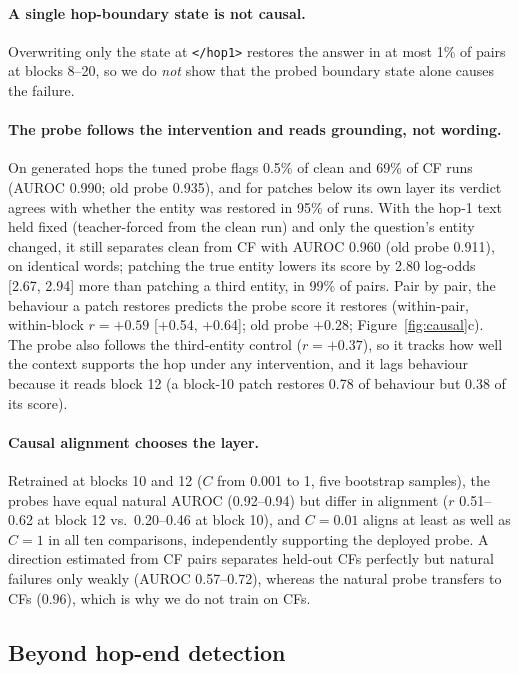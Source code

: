 \documentclass[11pt]{article}
\begin{document}
\paragraph{A single hop-boundary state is not causal.} Overwriting only the state at \texttt{</hop1>} restores the answer in at most 1\% of pairs at blocks 8--20, so we do \emph{not} show that the probed boundary state alone causes the failure.

\paragraph{The probe follows the intervention and reads grounding, not wording.} On generated hops the tuned probe flags 0.5\% of clean and 69\% of CF runs (AUROC 0.990; old probe 0.935), and for patches below its own layer its verdict agrees with whether the entity was restored in 95\% of runs. With the hop-1 text held fixed (teacher-forced from the clean run) and only the question's entity changed, it still separates clean from CF with AUROC 0.960 (old probe 0.911), on identical words; patching the true entity lowers its score by 2.80 log-odds [2.67, 2.94] more than patching a third entity, in 99\% of pairs. Pair by pair, the behaviour a patch restores predicts the probe score it restores (within-pair, within-block $r{=}+0.59$ [+0.54, +0.64]; old probe $+0.28$; Figure~\ref{fig:causal}c). The probe also follows the third-entity control ($r{=}+0.37$), so it tracks how well the context supports the hop under any intervention, and it lags behaviour because it reads block 12 (a block-10 patch restores 0.78 of behaviour but 0.38 of its score).

\paragraph{Causal alignment chooses the layer.} Retrained at blocks 10 and 12 ($C$ from 0.001 to 1, five bootstrap samples), the probes have equal natural AUROC (0.92--0.94) but differ in alignment ($r$ 0.51--0.62 at block 12 vs.\ 0.20--0.46 at block 10), and $C{=}0.01$ aligns at least as well as $C{=}1$ in all ten comparisons, independently supporting the deployed probe. A direction estimated from CF pairs separates held-out CFs perfectly but natural failures only weakly (AUROC 0.57--0.72), whereas the natural probe transfers to CFs (0.96), which is why we do not train on CFs.

\subsection{Beyond hop-end detection}
\end{document}

